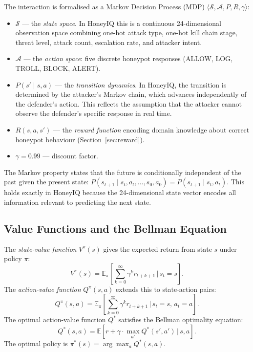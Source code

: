 The interaction is formalised as a Markov Decision Process (MDP)
$\langle \mathcal{S}, \mathcal{A}, P, R, \gamma \rangle$:
%
\begin{itemize}
  \item $\mathcal{S}$ --- the \emph{state space}.
        In HoneyIQ this is a continuous 24-dimensional observation space
        combining one-hot attack type, one-hot kill chain stage, threat level,
        attack count, escalation rate, and attacker intent.
  \item $\mathcal{A}$ --- the \emph{action space}: five discrete honeypot
        responses (ALLOW, LOG, TROLL, BLOCK, ALERT).
  \item $P(s' \mid s, a)$ --- the \emph{transition dynamics}.
        In HoneyIQ, the transition is determined by the attacker's Markov
        chain, which advances independently of the defender's action.
        This reflects the assumption that the attacker cannot observe the
        defender's specific response in real time.
  \item $R(s, a, s')$ --- the \emph{reward function} encoding domain
        knowledge about correct honeypot behaviour (Section~\ref{sec:reward}).
  \item $\gamma = 0.99$ --- discount factor.
\end{itemize}

The Markov property states that the future is conditionally independent of
the past given the present state:
$P(s_{t+1} \mid s_t, a_t, \ldots, s_0, a_0) = P(s_{t+1} \mid s_t, a_t)$.
This holds exactly in HoneyIQ because the 24-dimensional state vector
encodes all information relevant to predicting the next state.

\subsection{Value Functions and the Bellman Equation}

The \emph{state-value function} $V^\pi(s)$ gives the expected return from
state $s$ under policy $\pi$:
%
\begin{equation}
  V^\pi(s) = \mathbb{E}_\pi\!\left[\sum_{k=0}^{\infty} \gamma^k r_{t+k+1}
                                   \,\Big|\, s_t = s\right].
\end{equation}
%
The \emph{action-value function} $Q^\pi(s, a)$ extends this to
state-action pairs:
%
\begin{equation}
  Q^\pi(s, a) = \mathbb{E}_\pi\!\left[\sum_{k=0}^{\infty} \gamma^k r_{t+k+1}
                                      \,\Big|\, s_t = s,\, a_t = a\right].
\end{equation}
%
The optimal action-value function $Q^*$ satisfies the Bellman optimality
equation:
%
\begin{equation}
  Q^*(s, a) = \mathbb{E}\!\left[r + \gamma \cdot
              \max_{a'} Q^*(s', a') \,\Big|\, s, a\right].
  \label{eq:bellman}
\end{equation}
%
The optimal policy is $\pi^*(s) = \arg\max_a Q^*(s, a)$.

